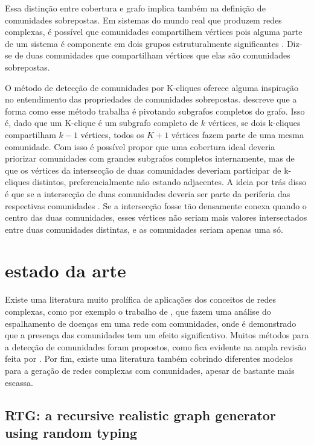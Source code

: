 \documentclass[notes.tex]{subfiles}
\begin{document}
Essa distinção entre cobertura e grafo implica também na definição de comunidades sobrepostas.
Em sistemas do mundo real que produzem redes complexas, é possível que comunidades compartilhem vértices pois alguma parte de um sistema é componente em dois grupos estruturalmente significantes \cite{shen2009detect}.
Diz-se de duas comunidades que compartilham vértices que elas são comunidades sobrepostas.

O método de detecção de comunidades por K-cliques oferece alguma inspiração no entendimento das propriedades de comunidades sobrepostas.
 descreve que a forma como esse método trabalha é pivotando subgrafos completos do grafo.
Isso é, dado que um K-clique é um subgrafo completo de $k$ vértices, se dois k-cliques compartilham  $k-1$ vértices, todos os $K+1$ vértices fazem parte de uma mesma comunidade.
Com isso é possível propor que uma cobertura ideal deveria priorizar comunidades com grandes subgrafos completos internamente, mas de que os vértices da intersecção de duas comunidades deveriam participar de k-cliques distintos, preferencialmente não estando adjacentes.
A ideia por trás disso é que se a intersecção de duas comunidades deveria ser parte da periferia das respectivas comunidades \cite{fortunato2010community}.
Se a intersecção fosse tão densamente conexa quando o centro das duas comunidades, esses vértices não seriam mais valores intersectados entre duas comunidades distintas, e as comunidades seriam apenas uma só.

\section{estado da arte\label{sec:estado_arte}}

Existe uma literatura muito prolífica de aplicações dos conceitos de redes complexas, como por exemplo o trabalho de , que fazem uma análise do espalhamento de doenças em uma rede com comunidades, onde é demonstrado que a presença das comunidades tem um efeito significativo.
Muitos métodos para a detecção de comunidades foram propostos, como fica evidente na ampla revisão feita por .
Por fim, existe uma literatura também cobrindo diferentes modelos para a geração de redes complexas com comunidades, apesar de bastante mais escassa.

\subsection{RTG: a recursive realistic graph generator using random typing}
\end{document}
